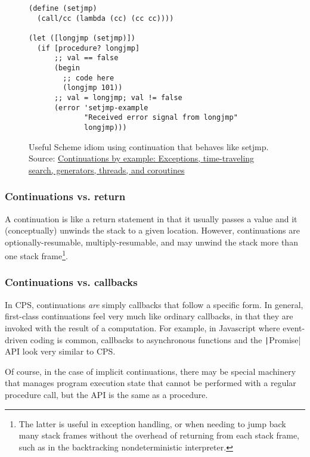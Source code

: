 \documentclass[]{article}
\begin{document}
\begin{figure}[]
  \centering
\begin{verbatim}
(define (setjmp)
  (call/cc (lambda (cc) (cc cc))))

(let ([longjmp (setjmp)])
  (if [procedure? longjmp]
      ;; val == false
      (begin
        ;; code here
        (longjmp 101))
      ;; val = longjmp; val != false
      (error 'setjmp-example
             "Received error signal from longjmp"
             longjmp)))
\end{verbatim}
  \caption{Useful Scheme idiom using continuation that behaves like setjmp. Source: \href{https://matt.might.net/articles/programming-with-continuations--exceptions-backtracking-search-threads-generators-coroutines/}{Continuations by example: Exceptions, time-traveling search, generators, threads, and coroutines}}
  \label{fig:idio}
\end{figure}

\subsubsection{Continuations vs. return}
\label{sec:retu}

A continuation is like a return statement in that it usually passes a value and it (conceptually) unwinds the stack to a given location. However, continuations are optionally-resumable, multiply-resumable, and may unwind the stack more than one stack frame\footnote{The latter is useful in exception handling, or when needing to jump back many stack frames without the overhead of returning from each stack frame, such as in the backtracking nondeterministic interpreter.}.

\subsubsection{Continuations vs. callbacks}
\label{sec:call}

In CPS, continuations \textit{are} simply callbacks that follow a specific form. In general, first-class continuations feel very much like ordinary callbacks, in that they are invoked with the result of a computation. For example, in Javascript where event-driven coding is common, callbacks to asynchronous functions and the \texttt|Promise| API look very similar to CPS.

Of course, in the case of implicit continuations, there may be special machinery that manages program execution state that cannot be performed with a regular procedure call, but the API is the same as a procedure.
\end{document}
